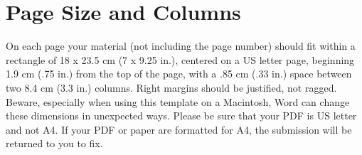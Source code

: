 \section{Page Size and Columns}

On each page your material (not including the page number) should fit
                                within a rectangle of 18 x 23.5 cm (7 x 9.25 in.), centered on a US
                                letter page, beginning 1.9 cm (.75 in.) from the top of the page, with
                                a .85 cm (.33 in.) space between two 8.4 cm (3.3 in.) columns.  Right
                                margins should be justified, not ragged. Beware, especially when using
                                this template on a Macintosh, Word can change these dimensions in
                                unexpected ways. Please be sure that your PDF is US letter and not
                                A4. If your PDF or paper are formatted for A4, the submission will be
                                returned to you to fix.